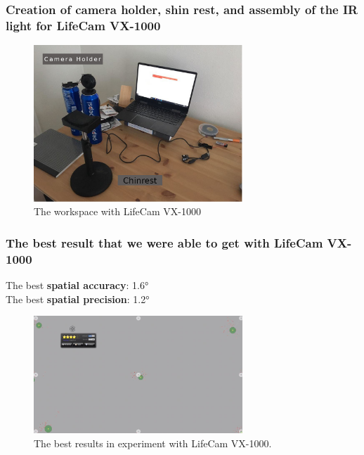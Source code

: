 \documentclass{beamer}
\begin{document}
    \begin{frame}
        \frametitle{Creation of camera holder, shin rest, and assembly of the
        IR light for LifeCam VX-1000}

        \begin{figure}
            \begin{center}
                \includegraphics[width=0.7\textwidth]{Work_space_VX_1000.jpg}
            \end{center}
            \caption{The workspace with LifeCam VX-1000}
            \label{fig:Workspace_VX}
        \end{figure}

    \end{frame}

    \begin{frame}
        \frametitle{The best result that we were able to get with LifeCam VX-1000}

        \center
        The best \textbf{spatial accuracy}: \ang{1.6} \\
        The best \textbf{spatial precision}: \ang{1.2}

        \begin{figure}
            \begin{center}
                \includegraphics[width=0.7\textwidth]{Best_res_VX_1000.jpg}
            \end{center}
            \caption{The best results in experiment with LifeCam VX-1000.}
            \label{fig:Best_VX}
        \end{figure}

    \end{frame}
\end{document}
